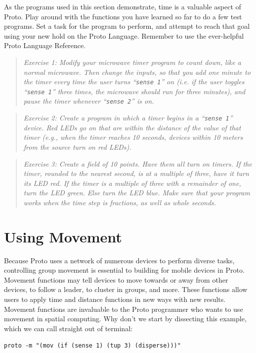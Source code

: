 \documentclass{article}
\newcommand\code[1]{\begin{center}\var{#1}\end{center}}
\newcommand\problem[1]{\begin{quote}{\em #1}\end{quote}}
\newcommand\var[1]{{\tt #1}}
\newcommand\qvar[1]{``{\tt #1}''}
\begin{document}
As the programs used in this section demonstrate, time is a valuable
aspect of Proto.  Play around with the functions you have learned so
far to do a few test programs.  Set a task for the program to perform,
and attempt to reach that goal using your new hold on the Proto
Language.  Remember to use the ever-helpful Proto Language Reference.
	
\problem{Exercise 1: Modify your microwave timer program to count
  down, like a normal microwave.  Then change the inputs, so that you
  add one minute to the timer every time the user turns \qvar{sense 1}
  on (i.e. if the user toggles \qvar{sense 1} three times, the
  microwave should run for three minutes), and pause the timer
  whenever \qvar{sense 2} is on.}

\problem{Exercise 2: Create a program in which a timer begins in a
  \qvar{sense 1} device.  Red LEDs go on that are within the distance
  of the value of that timer (e.g., when the timer reaches 10 seconds,
  devices within 10 meters from the source turn on red LEDs).}

\problem{Exercise 3: Create a field of 10 points. Have them all turn
  on timers.  If the timer, rounded to the nearest second, is at a
  multiple of three, have it turn its LED red.  If the timer is a
  multiple of three with a remainder of one, turn the LED green.  Else
  turn the LED blue.  Make sure that your program works when the time
  step is fractions, as well as whole seconds.}


\section{Using Movement}

Because Proto uses a network of numerous devices to perform diverse
tasks, controlling group movement is essential to building for mobile
devices in Proto.  Movement functions may tell devices to move
towards or away from other devices, to follow a leader, to cluster in
groups, and more.  These functions allow users to apply time and
distance functions in new ways with new results. Movement functions
are invaluable to the Proto programmer who wants to use movement in
spatial computing.  Why don't we start by dissecting this example,
which we can call straight out of terminal:

\code{proto -m "(mov (if (sense 1) (tup 3) (disperse)))"}
\end{document}
